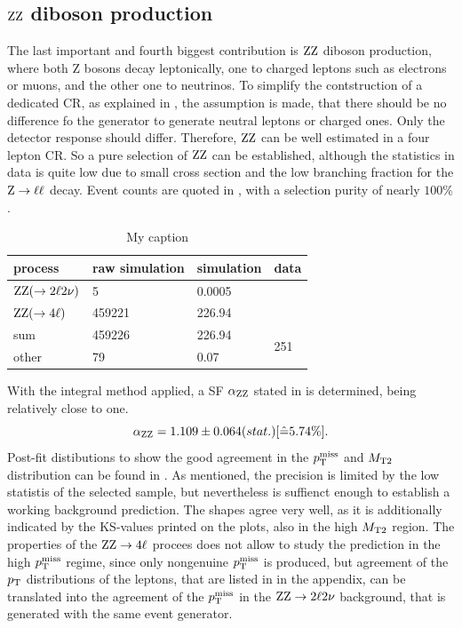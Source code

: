 \subsection{$\mathrm{Z}\mathrm{Z}$ diboson production}
The last important and fourth biggest contribution is $\mathrm{Z}\mathrm{Z}$ diboson production, where both Z bosons decay leptonically, one to charged leptons such as electrons or muons, and the other one to neutrinos. To simplify the contstruction of a dedicated CR, as explained in , the assumption is made, that there should be no difference fo the generator to generate neutral leptons or charged ones. Only the detector response should differ. Therefore, $\mathrm{Z}\mathrm{Z}$ can be well estimated in a four lepton CR. So a pure selection of $\mathrm{Z}\mathrm{Z}$ can be established, although the statistics in data is quite low due to small cross section and the low branching fraction for the $\mathrm{Z}\to\ell\ell$ decay. Event counts are quoted in , with a selection purity of nearly $100\%$.
\begin{table}[htb]
 \centering
 \caption{My caption}
 \label{tab:CRWT}
 \begin{tabular}{llll}
  
  process                 & raw simulation & simulation & data                 \\\hline
  $\mathrm{Z}\mathrm{Z}(\to2\ell2\nu)$ & 5              & 0.0005     &                      \\
  $\mathrm{Z}\mathrm{Z}(\to4\ell)$      & 459221         & 226.94     &                      \\\hline\hline
  sum                     & 459226         & 226.94     & \multirow{2}{*}{251} \\
  other                   & 79             & 0.07       &                      
 \end{tabular}
\end{table}
With the integral method applied, a SF $\alpha_{\mathrm{Z}\mathrm{Z}}$ stated in  is determined, being relatively close to one.
\begin{equation}\label{eq:AlphaZZ}
 \alpha_{\mathrm{Z}\mathrm{Z}}=1.109 \pm 0.064 (stat.) [\hat{=}5.74\%].
\end{equation}
Post-fit distibutions to show the good agreement in the $p_{\mathrm{T}}^\text{miss}$ and $M_{\mathrm{T2}}$ distribution can be found in . As mentioned, the precision is limited by the low statistis of the selected sample, but nevertheless is suffienct enough to establish a working background prediction. The shapes agree very well, as it is additionally indicated by the KS-values printed on the plots, also in the high $M_{\mathrm{T2}}$ region. The properties of the $\mathrm{Z}\mathrm{Z}\to4\ell$ procees does not allow to study the prediction in the high $p_{\mathrm{T}}^\text{miss}$ regime, since only nongenuine $p_{\mathrm{T}}^\text{miss}$ is produced, but agreement of the $p_{\mathrm{T}}$ distributions of the leptons, that are listed in  in the appendix, can be translated into the agreement of the $p_{\mathrm{T}}^\text{miss}$ in the $\mathrm{Z}\mathrm{Z}\to2\ell2\nu$ background, that is generated with the same event generator.
